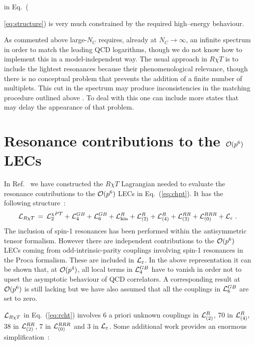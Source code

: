 \documentclass{appolb}
\begin{document}
in Eq.~({\ref{eq:structure}) is very much constrained by the required high--energy behaviour. 
\par
As commented above large-$N_C$ requires, already at $N_C \rightarrow \infty$, an infinite spectrum in order to match 
the leading QCD logarithms, though we do not know how to implement this in a model-independent way. The usual approach
in $R \chi T$ is to include the lightest resonances because their phenomenological relevance, though there is no
conceptual problem that prevents the addition of a finite number of multiplets. This cut in the spectrum  may produce
inconsistencies in the matching procedure outlined above \cite{Bijnens:2003rc}. To deal with this one can include
more states that may delay the appearance of that problem. 

\section{Resonance contributions to the ${\cal O}(p^6)$ LECs}
In Ref.~\cite{Cirigliano:2006hb} we have constructed the $R \chi T$ Lagrangian needed to evaluate the resonance
contributions to the ${\cal O}(p^6)$ LECs in Eq.~(\ref{eq:chpt}). It has the following structure~:
\begin{equation} \label{eq:rcht}
{\cal L}_{R\chi T} \, = \, {\cal L}_2^{\chi PT}  +  {\cal L}_4^{GB}  +  {\cal L}_6^{GB}  +  
{\cal L}_{\mathrm{kin}}^R    + {\cal L}_{(2)}^R  +  {\cal L}_{(4)}^R  +  {\cal L}_{(2)}^{RR}  +
  {\cal L}_{(0)}^{RRR}  + 
{\cal L}_{\varepsilon} \; .
\end{equation}
The inclusion of spin-1 resonances has been performed within the antisymmetric tensor formalism. However there are
independent contributions to the ${\cal O}(p^6)$ LECs coming from odd-intrinsic-parity couplings involving spin-1 
resonances in the Proca formalism. These are included in ${\cal L}_{\varepsilon}$. In the above representation
it can be shown \cite{Ecker:1989yg} that, at  ${\cal O}(p^4)$, all local terms in ${\cal L}_4^{GB}$ have to vanish
in order not to upset the asymptotic behaviour of QCD correlators. A corresponding result at ${\cal O}(p^6)$ is still
lacking but we have also assumed that all the couplings in ${\cal L}_6^{GB}$ are set to zero.
\par
${\cal L}_{R \chi T}$ in Eq.~(\ref{eq:rcht}) involves 6 a priori unknown couplings in ${\cal L}_{(2)}^R$, 70 in 
${\cal L}_{(4)}^R,$ 38 in ${\cal L}_{(2)}^{RR}$, 7 in ${\cal L}_{(0)}^{RRR}$ and 3 in ${\cal L}_{\varepsilon}$. Some
additional work provides an enormous simplification~: \vspace*{0.2cm} \\
}
\end{document}
